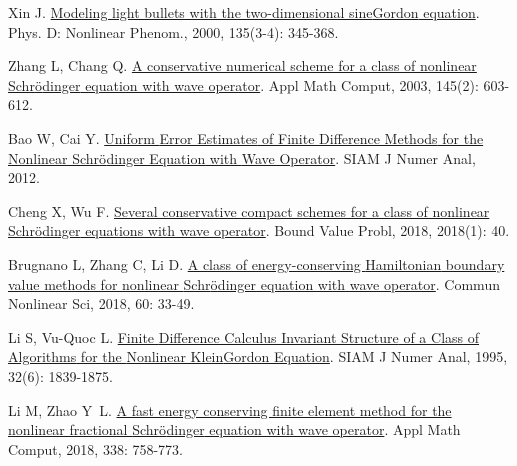 \begin{thebibliography}{79}
    Xin J.
    \newblock \href{https://linkinghub.elsevier.com/retrieve/pii/S0167278999001281}{Modeling light bullets with the two-dimensional sine{\textendash}{{Gordon}} equation}\allowbreak[J].
    \newblock Phys. D: Nonlinear Phenom., 2000, 135\allowbreak (3-4): 345-368.
    
    Zhang L, Chang Q.
    \newblock \href{https://www.sciencedirect.com/science/article/pii/S0096300302008421}{A conservative numerical scheme for a class of nonlinear {{Schr{\"o}dinger}} equation with wave operator}\allowbreak[J].
    \newblock Appl Math Comput, 2003, 145\allowbreak (2): 603-612.
    
    Bao W, Cai Y.
    \newblock \href{https://epubs.siam.org/doi/10.1137/110830800}{Uniform {{Error Estimates}} of {{Finite Difference Methods}} for the {{Nonlinear Schr{\"o}dinger Equation}} with {{Wave Operator}}}\allowbreak[J].
    \newblock SIAM J Numer Anal, 2012.
    
    Cheng X, Wu F.
    \newblock \href{https://boundaryvalueproblems.springeropen.com/articles/10.1186/s13661-018-0956-4}{Several conservative compact schemes for a class of nonlinear {{Schr{\"o}dinger}} equations with wave operator}\allowbreak[J].
    \newblock Bound Value Probl, 2018, 2018\allowbreak (1): 40.
    
    Brugnano L, Zhang C, Li D.
    \newblock \href{https://linkinghub.elsevier.com/retrieve/pii/S1007570417304409}{A class of energy-conserving {{Hamiltonian}} boundary value methods for nonlinear {{Schr{\"o}dinger}} equation with wave operator}\allowbreak[J].
    \newblock Commun Nonlinear Sci, 2018, 60: 33-49.
    
    Li S, {Vu-Quoc} L.
    \newblock \href{https://epubs.siam.org/doi/10.1137/0732083}{Finite {{Difference Calculus Invariant Structure}} of a {{Class}} of {{Algorithms}} for the {{Nonlinear Klein}}{\textendash}{{Gordon Equation}}}\allowbreak[J].
    \newblock SIAM J Numer Anal, 1995, 32\allowbreak (6): 1839-1875.
    
    Li M, Zhao Y~L.
    \newblock \href{https://linkinghub.elsevier.com/retrieve/pii/S0096300318304983}{A fast energy conserving finite element method for the nonlinear fractional {{Schr{\"o}dinger}} equation with wave operator}\allowbreak[J].
    \newblock Appl Math Comput, 2018, 338: 758-773.
    

\end{thebibliography}
